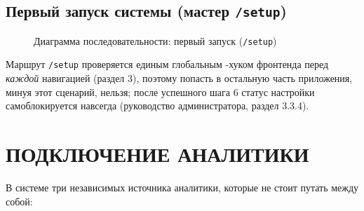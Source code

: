 \subsection{Первый запуск системы (мастер \texttt{/setup})}

\begin{figure}[htbp]
\centering
{}
\caption{Диаграмма последовательности: первый запуск (\texttt{/setup})}
\end{figure}

Маршрут \texttt{/setup} проверяется единым глобальным
-хуком фронтенда перед \emph{каждой}
навигацией (раздел 3), поэтому попасть в остальную часть приложения,
минуя этот сценарий, нельзя; после успешного шага 6 статус настройки
самоблокируется навсегда (руководство администратора, раздел 3.3.4).

\section{ПОДКЛЮЧЕНИЕ АНАЛИТИКИ}

В системе три независимых источника аналитики, которые не стоит путать
между собой:

